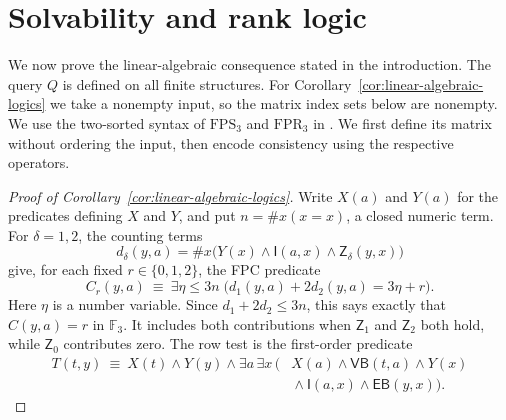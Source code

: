 \section{Solvability and rank logic}\label{sec:linear-algebraic-logics}

We now prove the linear-algebraic consequence stated in the introduction.
The query $Q$ is defined on all finite structures. For
Corollary~\ref{cor:linear-algebraic-logics} we take a nonempty input, so
the matrix index sets below are nonempty. We use the two-sorted syntax
of $\mathrm{FPS}_3$ and $\mathrm{FPR}_3$ in
\cite[Section~2]{graedelPakusa2019}.
We first define its matrix without ordering the input, then encode
consistency using the respective operators.

\begin{proof}[Proof of Corollary~\ref{cor:linear-algebraic-logics}]
Write $X(a)$ and $Y(a)$ for the predicates defining $X$ and $Y$, and put
$n=\#x(x=x)$, a closed numeric term. For $\delta=1,2$, the counting terms
\[
 d_\delta(y,a)=\#x\bigl(Y(x)\wedge\mathsf I(a,x)
                         \wedge\mathsf Z_\delta(y,x)\bigr)
\]
give, for each fixed $r\in\{0,1,2\}$, the FPC predicate
\[
 C_r(y,a)\ \equiv\
 \exists\eta\leq 3n\;\bigl(d_1(y,a)+2d_2(y,a)=3\eta+r\bigr).
\]
Here $\eta$ is a number variable. Since $d_1+2d_2\leq3n$, this says
exactly that $C(y,a)=r$ in $\mathbb F_3$. It includes both contributions
when $\mathsf Z_1$ and $\mathsf Z_2$ both hold, while $\mathsf Z_0$
contributes zero. The row test is the first-order predicate
\[
\begin{split}
 T(t,y)\ \equiv\ X(t)\wedge Y(y)\wedge\exists a\,\exists x\,
 \bigl(&X(a)\wedge\mathsf{VB}(t,a)\wedge Y(x)\\
       &{}\wedge\mathsf I(a,x)\wedge\mathsf{EB}(y,x)\bigr).
\end{split}
\]


\end{proof}

